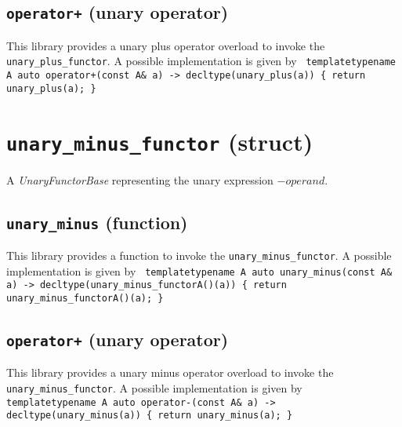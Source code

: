 \documentclass[oneside]{book}
\begin{document}
\subsection{\texttt{operator+} (unary operator)}
This library provides a unary plus operator overload to invoke the \texttt{unary\_plus\_functor}.
A possible implementation is given by\newline
\texttt{
template\textlangle typename A\textrangle\newline
auto operator+(const A\& a) -> decltype(unary\_plus(a))\newline
\{ return unary\_plus(a); \}
}

\section{\texttt{unary\_minus\_functor} (struct)}
A \textit{UnaryFunctorBase} representing the unary expression $-\textit{operand}$.\newline

\subsection{\texttt{unary\_minus} (function)}
This library provides a function to invoke the \texttt{unary\_minus\_functor}.
A possible implementation is given by\newline
\texttt{
template\textlangle typename A\textrangle\newline
auto unary\_minus(const A\& a) -> decltype(unary\_minus\_functor\textlangle A\textrangle()(a))\newline
\{ return unary\_minus\_functor\textlangle A\textrangle()(a); \}
}

\subsection{\texttt{operator+} (unary operator)}
This library provides a unary minus operator overload to invoke the \texttt{unary\_minus\_functor}.
A possible implementation is given by\newline
\texttt{
template\textlangle typename A\textrangle\newline
auto operator-(const A\& a) -> decltype(unary\_minus(a))\newline
\{ return unary\_minus(a); \}
}





\end{document}
